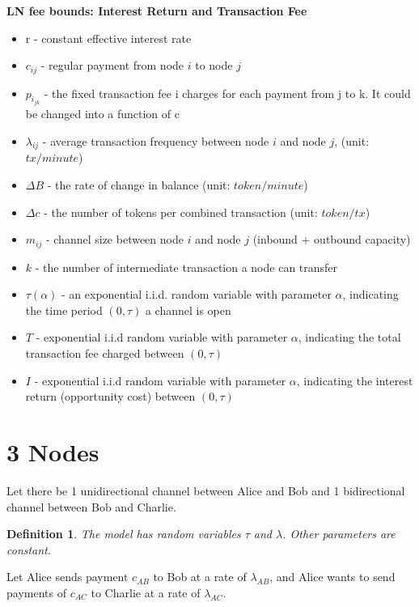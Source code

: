 \documentclass[12pt]{article}
\newtheorem{defi}[theorem]{Definition}
\theoremstyle{plain}
\theoremstyle{remark}
\theoremstyle{definition}
\begin{document}
\begin{center}
\begin{Large}
\textbf{LN fee bounds: Interest Return and Transaction Fee}

\end{Large}
\end{center}

\begin{itemize}
  \item r - constant effective interest rate
  \item $c_{ij}$ - regular payment from node $i$ to node $j$
  \item $p_{i_{jk}}$ - the fixed transaction fee i charges for each payment from j to k. It could be changed into a function of c
  \item $\lambda_{ij}$ - average transaction frequency between node $i$ and node $j$, (unit: $tx/minute$)
  \item $\Delta B$ - the rate of change in balance (unit: $token/minute$)
  \item $\Delta c$ - the number of tokens per combined transaction (unit: $token/tx$)
  \item $m_{ij}$ - channel size between node $i$ and node $j$ (inbound + outbound capacity)
  \item $k$ - the number of intermediate transaction a node can transfer
  \item $\tau(\alpha)$ - an exponential i.i.d. random variable with parameter $\alpha$, indicating the time period $(0,\tau)$ a channel is open 
  \item $T$ - exponential i.i.d random variable with parameter $\alpha$, indicating the total transaction fee charged between $(0,\tau)$
  \item $I$ - exponential i.i.d random variable with parameter $\alpha$, indicating the interest return (opportunity cost) between $(0,\tau)$
\end{itemize}
\section{3 Nodes }
Let there be 1 unidirectional channel between Alice and Bob and 1 bidirectional channel between Bob and Charlie. \\
\begin{defi}
    The model has random variables $\tau$ and $\lambda$. Other parameters are constant. 
\end{defi}
Let Alice sends payment $c_{AB}$ to Bob at a rate of $\lambda_{AB}$, and Alice wants to send payments of $c_{AC}$ to Charlie at a rate of $\lambda_{AC}$. 
\end{document}
